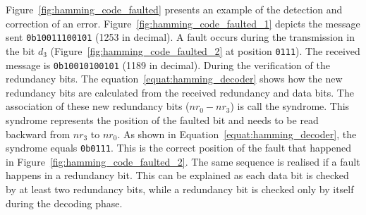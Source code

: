 Figure~\ref{fig:hamming_code_faulted} presents an example of the detection and correction of an error. Figure~\ref{fig:hamming_code_faulted_1} depicts the message sent \texttt{0b10011100101} (1253 in decimal). A fault occurs during the transmission in the bit $d_3$ (Figure~\ref{fig:hamming_code_faulted_2} at position \texttt{0111}). The received message is \texttt{0b10010100101} (1189 in decimal).
During the verification of the redundancy bits. The equation~\ref{equat:hamming_decoder} shows how the new redundancy bits are calculated from the received redundancy and data bits. The association of these new redundancy bits ($nr_{0}-nr_{3}$) is call the syndrome. This syndrome represents the position of the faulted bit and needs to be read backward from $nr_3$ to $nr_0$. As shown in Equation~\ref{equat:hamming_decoder}, the syndrome equals \texttt{0b0111}. This is the correct position of the fault that happened in Figure~\ref{fig:hamming_code_faulted_2}. The same sequence is realised if a fault happens in a redundancy bit. This can be explained as each data bit is checked by at least two redundancy bits, while a redundancy bit is checked only by itself during the decoding phase.


